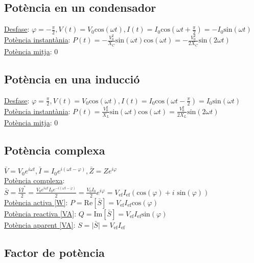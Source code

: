 \documentclass[10pt]{article}
\begin{document}
\begin{multicols}{5}
\subsection{Potència en un condensador}

\underline{Desfase}: $\varphi = -\frac{\pi}{2}, V(t) = V_0\text{cos}(\omega t), I(t) = I_0\text{cos}(\omega t + \frac{\pi}{2}) = -I_0\text{sin}(\omega t)$ \\
\underline{Potència instantània}: $P(t) = -\frac{V_0^2}{X_C}\text{sin}(\omega t)\text{cos}(\omega t) = -\frac{V_0^2}{2X_C}\text{sin}(2\omega t)$ \\
\underline{Potència mitja}: 0

\subsection{Potència en una inducció}

\underline{Desfase}: $\varphi = \frac{\pi}{2}, V(t) = V_0\text{cos}(\omega t), I(t) = I_0\text{cos}(\omega t - \frac{\pi}{2}) = I_0\text{sin}(\omega t)$ \\
\underline{Potència instantània}: $P(t) = \frac{V_0^2}{X_L}\text{sin}(\omega t)\text{cos}(\omega t) = \frac{V_0^2}{2X_L}\text{sin}(2\omega t)$ \\
\underline{Potència mitja}: 0

\subsection{Potència complexa}

$\bar{V} = V_0e^{i\omega t}, \bar{I} = I_0e^{i(\omega t - \varphi)}, \bar{Z} = Z e^{i\varphi}$ \\
\underline{Potència complexa}: $\bar{S} = \frac{\bar{V}\bar{I}^*}{2} = \frac{V_0e^{i\omega t}I_0e^{-i(\omega t - \varphi)}}{2} = \frac{V_0I_0}{2}e^{i\varphi} = V_{\text{ef}}I_{\text{ef}}(\text{cos}(\varphi) + i\text{ sin}(\varphi))$ \\
\underline{Potència activa [W]}: $P = \text{Re}[\bar{S}] = V_{\text{ef}}I_{\text{ef}}\text{cos}(\varphi)$ \\
\underline{Potència reactiva [VA]}: $Q = \text{Im}[\bar{S}] = V_{\text{ef}}I_{\text{ef}}\text{sin}(\varphi)$ \\
\underline{Potència aparent [VA]}: $S = \vert \bar{S} \vert = V_{\text{ef}}I_{\text{ef}}$

\subsection{Factor de potència}


\end{multicols}
\end{document}
